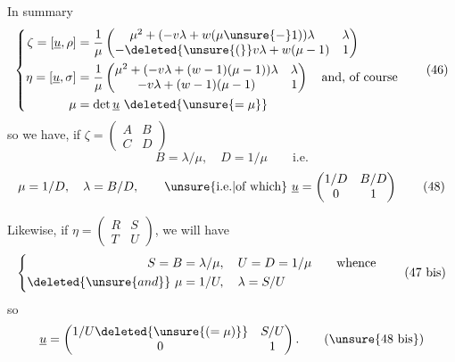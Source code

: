 In summary
\[
\left\{\begin{aligned}
\zeta=[\underline u,\rho]
&=\frac1\mu\begin{pmatrix}
\mu^2+(-v\lambda+w(\mu\unsure{-}1))\lambda&\lambda\\
-\deleted{\unsure{(}}v\lambda+w(\mu-1)&1
\end{pmatrix}\\
\eta=[\underline u,\sigma]
&=\frac1\mu\begin{pmatrix}
\mu^2+(-v\lambda+(w-1)(\mu-1))\lambda&\lambda\\
-v\lambda+(w-1)(\mu-1)&1
\end{pmatrix}\quad\text{and, of course}\\
\mu&=\det\underline u\ \deleted{\unsure{=\mu}}
\end{aligned}\right. \tag{46}
\]
so we have, if $\zeta=\begin{pmatrix}A&B\\C&D\end{pmatrix}$
\[
B=\lambda/\mu,\quad D=1/\mu\qquad\text{i.e.} \tag{47}
\]
\[
\mu=1/D,\quad\lambda=B/D,\qquad\text{\unsure{i.e.|of which} }\underline u=\begin{pmatrix}1/D&B/D\\0&1\end{pmatrix} \tag{48}
\]


Likewise, if $\eta=\begin{pmatrix}R&S\\T&U\end{pmatrix}$, we will have 
\[
\left\{\begin{aligned}
S=B&=\lambda/\mu,\quad U=D=1/\mu\qquad\text{whence}\\
\deleted{\unsure{and}}\ \mu&=1/U,\quad\lambda=S/U
\end{aligned}\right. \tag{47 bis}
\]
so
\[
\underline u=\begin{pmatrix}1/U\deleted{\unsure{(=\mu)}}&S/U\\0&1\end{pmatrix}. \tag{\unsure{48 bis}}
\]

